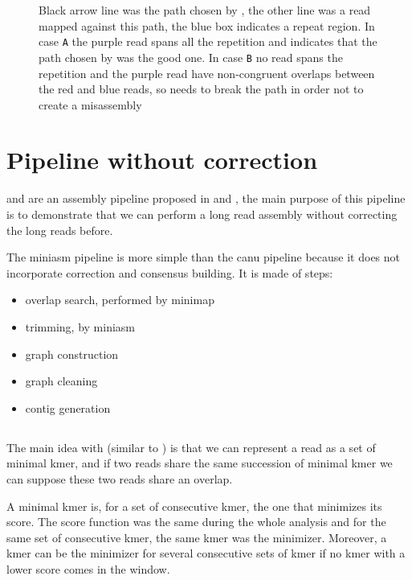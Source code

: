 \documentclass[main]{subfiles}
\begin{document}
\begin{figure}[ht]
    \centering
    
    \caption{Black arrow line was the path chosen by \canu, the other line was a read mapped against this path, the blue box indicates a repeat region. In case \texttt{A} the purple read spans all the repetition and indicates that the path chosen by \canu was the good one. In case \texttt{B} no read spans the repetition and the purple read have non-congruent overlaps between the red and blue reads, so \canu needs to break the path in order not to create a misassembly}
    \label{sota:fig:canu:remapping}
\end{figure}

\section{Pipeline without correction \miniasm} \label{section:sota:miniasm}

\minimap and \miniasm are an assembly pipeline proposed in \cite{miniasm_minimap} and \cite{minimap2}, the main purpose of this pipeline is to demonstrate that we can perform a long read assembly without correcting the long reads before.

The miniasm pipeline is more simple than the canu pipeline because it does not incorporate correction and consensus building. It is made of steps:
\begin{itemize}
    \item overlap search, performed by minimap
    \item trimming, by miniasm
    \item graph construction 
    \item graph cleaning
    \item contig generation
\end{itemize}


\subsection{\minimap} \label{subsec:sota:miniasm:minimap}

The main idea with \minimap (similar to \mhap) is that we can represent a read as a set of minimal kmer, and if two reads share the same succession of minimal kmer we can suppose these two reads share an overlap.

A minimal kmer is, for a set of consecutive kmer, the one that minimizes its score. The score function was the same during the whole analysis and for the same set of consecutive kmer, the same kmer was the minimizer. Moreover, a kmer can be the minimizer for several consecutive sets of kmer if no kmer with a lower score comes in the window. 
\end{document}
